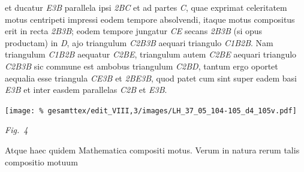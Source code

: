 %
%
et ducatur \textit{E{\scriptsize 3}B}
parallela ipsi \textit{{\scriptsize 2}BC}
et ad partes \textit{C},
%
quae exprimat celeritatem motus centripeti%
\protect{}%
\protect{}
impressi eodem tempore absolvendi,
itaque motus compositus erit in recta
\textit{{\scriptsize2}B{\scriptsize3}B};
eodem tempore jungatur \textit{CE} secans
\textit{{\scriptsize2}B{\scriptsize3}B}
(si opus productam)
in \textit{D},
ajo triangulum \textit{C{\scriptsize2}B{\scriptsize3}B}
aequari triangulo \textit{C{\scriptsize1}B{\scriptsize2}B}.
Nam triangulum \textit{C{\scriptsize1}B{\scriptsize2}B}
aequatur \textit{C{\scriptsize2}BE},
triangulum autem \textit{C{\scriptsize2}BE}
aequari triangulo \textit{C{\scriptsize2}B{\scriptsize3}B}
sic%
\protect{}
%
%
commune est ambobus triangulum \textit{C{\scriptsize2}BD},
tantum ergo oportet aequalia esse triangula
\textit{CE{\scriptsize3}B} et \textit{{\scriptsize2}BE{\scriptsize3}B},
quod patet
cum sint super eadem basi \textit{E{\scriptsize3}B}
et inter easdem parallelas
\textit{C{\scriptsize2}B} et \textit{E{\scriptsize3}B}.%
%
\pend%
\newpage
%
%
\centerline{\texttt{[image: \%
gesamttex/edit\_VIII,3/images/LH\_37\_05\_104-105\_d4\_105v.pdf]}}
\vspace{0.5em}
\centerline{\lbrack\textit{Fig.~4}\rbrack}
\vspace{1.5em}
%
%
\pstart%
%
Atque haec quidem
%
%
Mathematica compositi motus.%
\protect{}%
\protect{}%
\protect{}
Verum in natura rerum%
\protect{}
talis compositio motuum%
